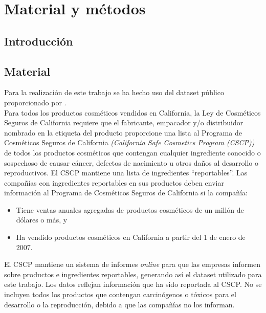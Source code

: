 
\chapter{Material y métodos} %
\label{chap:material-methods} %


\section{Introducción}




\section{Material}
Para la realización de este trabajo se ha hecho uso del dataset público  \citep{dataset} proporcionado por  \citep{healthdata}. \\

Para todos los productos cosméticos vendidos en California, la Ley de Cosméticos Seguros de California requiere que el fabricante, empacador y/o distribuidor nombrado en la etiqueta del producto proporcione una lista al Programa de Cosméticos Seguros de California \textit{(California Safe Cosmetics Program (CSCP))} de todos los productos cosméticos que contengan cualquier ingrediente conocido o sospechoso de causar cáncer, defectos de nacimiento u otros daños al desarrollo o reproductivos. El CSCP mantiene una lista de ingredientes ``reportables''. Las compañías con ingredientes reportables en sus productos deben enviar información al Programa de Cosméticos Seguros de California si la compañía:

\begin{itemize}
 \item Tiene ventas anuales agregadas de productos cosméticos de un millón de dólares o más, y
 \item Ha vendido productos cosméticos en California a partir del 1 de enero de 2007.
\end{itemize}

El CSCP mantiene un sistema de informes \textit{online} para que las empresas informen sobre productos e ingredientes reportables, generando así el dataset utilizado para este trabajo. Los datos reflejan información que ha sido reportada al CSCP. No se incluyen todos los productos que contengan carcinógenos o tóxicos para el desarrollo o la reproducción, debido a que las compañías no los informan.



